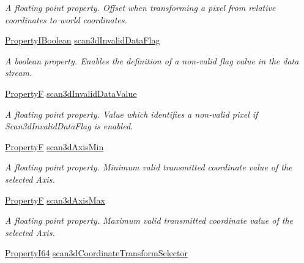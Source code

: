 \begin{DoxyCompactItemize}
\begin{DoxyCompactList}\small\item\em A floating point property. Offset when transforming a pixel from relative coordinates to world coordinates. \end{DoxyCompactList}\item 
\hyperlink{group___common_interface_ga44f9437e24b21b6c93da9039ec6786aa}{Property\+I\+Boolean} \hyperlink{classmv_i_m_p_a_c_t_1_1acquire_1_1_gen_i_cam_1_1_scan3d_control_a4f7140afe110debf04ca3ef728123a93}{scan3d\+Invalid\+Data\+Flag}
\begin{DoxyCompactList}\small\item\em A boolean property. Enables the definition of a non-\/valid flag value in the data stream. \end{DoxyCompactList}\item 
\hyperlink{group___common_interface_gaf54865fe5a3d5cfd15f9a111b40d09f9}{Property\+F} \hyperlink{classmv_i_m_p_a_c_t_1_1acquire_1_1_gen_i_cam_1_1_scan3d_control_a5df5e46758c323e9c11aa39fb966cda4}{scan3d\+Invalid\+Data\+Value}
\begin{DoxyCompactList}\small\item\em A floating point property. Value which identifies a non-\/valid pixel if Scan3d\+Invalid\+Data\+Flag is enabled. \end{DoxyCompactList}\item 
\hyperlink{group___common_interface_gaf54865fe5a3d5cfd15f9a111b40d09f9}{Property\+F} \hyperlink{classmv_i_m_p_a_c_t_1_1acquire_1_1_gen_i_cam_1_1_scan3d_control_aabaa82663dc20332e2533f8b24f58549}{scan3d\+Axis\+Min}
\begin{DoxyCompactList}\small\item\em A floating point property. Minimum valid transmitted coordinate value of the selected Axis. \end{DoxyCompactList}\item 
\hyperlink{group___common_interface_gaf54865fe5a3d5cfd15f9a111b40d09f9}{Property\+F} \hyperlink{classmv_i_m_p_a_c_t_1_1acquire_1_1_gen_i_cam_1_1_scan3d_control_a7052c2bf595e8e55ef796250715c207c}{scan3d\+Axis\+Max}
\begin{DoxyCompactList}\small\item\em A floating point property. Maximum valid transmitted coordinate value of the selected Axis. \end{DoxyCompactList}\item 
\hyperlink{group___common_interface_ga81749b2696755513663492664a18a893}{Property\+I64} \hyperlink{classmv_i_m_p_a_c_t_1_1acquire_1_1_gen_i_cam_1_1_scan3d_control_ae1747ee2575736760337915cafba819d}{scan3d\+Coordinate\+Transform\+Selector}

\end{DoxyCompactItemize}
